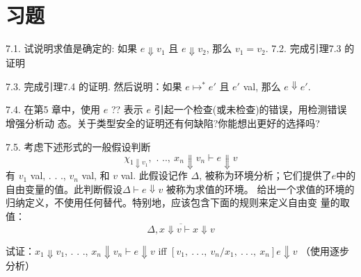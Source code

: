 \section{习题}

7.1. 试说明求值是确定的:  如果 $e\Downarrow v_{1}$ 且 $e\Downarrow v_{2}$, 那么 $v_{1} =v_{2}.$%
7.2.  完成引理7.3 的证明 %

7.3.  完成引理7.4 的证明.  然后说明：如果 $e\mapsto^{*}e'$ 且 $e'$ val, 那么 $e\Downarrow e'.$

7.4. 在第5 章中，使用 $e$ ?? 表示 $e$ 引起一个检查(或未检查)的错误，用检测错误增强分析动
态。关于类型安全的证明还有何缺陷?你能想出更好的选择吗? 

7.5. 考虑下述形式的一般假设判断
$$
\chi_{1\Downarrow v_{1}},\text{ . }..,\ x_{n}\Downarrow v_{n}\vdash e\Downarrow v
$$%
有 $v_{1}$ val, . . ., $v_{n}$ val, 和 $v$ val. 此假设记作 $\Delta$, 被称为环境分析；它们提供了$e$中的自由变量的值。此判断假设$\Delta\vdash e\Downarrow v$ 被称为求值的环境。%
给出一个求值的环境的归纳定义，不使用任何替代。特别地，应该包含下面的规则来定义自由变  %
量的取值：
$$
\overline{\Delta,x\Downarrow v\vdash x\Downarrow v}
$$

试证：$x_{1} \Downarrow v_{1}$, . . ., $x_{n} \Downarrow v_{n} \vdash e \Downarrow v$ iff $[v_{1},\ .\ .\ .,\ v_{n}/x_{1},\ .\ .\ .,\ x_{n}]e \Downarrow v$ （使用逐步分析）%
